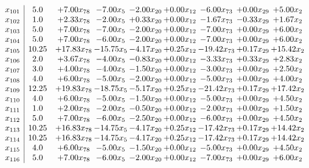 \documentclass[8pt]{article}
\begin{document}
\[\begin{array}{c| c c@{\hskip 2pt} c@{\hskip 2pt} c@{\hskip 2pt} c@{\hskip 2pt} c@{\hskip 2pt} c@{\hskip 2pt} c@{\hskip 2pt} }
 x_{101}   &  5.0 & +  7.00 x_{78} & -7.00 x_{5} & -2.00 x_{20} & +  0.00 x_{12} & -6.00 x_{73} & +  0.00 x_{29} & +  5.00 x_{2}\\
 x_{102}   &  1.0 & +  2.33 x_{78} & -2.00 x_{5} & +  0.33 x_{20} & +  0.00 x_{12} & -1.67 x_{73} & -0.33 x_{29} & +  1.67 x_{2}\\
 x_{103}   &  5.0 & +  7.00 x_{78} & -7.00 x_{5} & -2.00 x_{20} & +  0.00 x_{12} & -7.00 x_{73} & +  0.00 x_{29} & +  6.00 x_{2}\\
 x_{104}   &  5.0 & +  7.00 x_{78} & -6.00 x_{5} & -2.00 x_{20} & +  0.00 x_{12} & -7.00 x_{73} & +  0.00 x_{29} & +  6.00 x_{2}\\
 x_{105}   &  10.25 & + 17.83 x_{78} & -15.75 x_{5} & -4.17 x_{20} & +  0.25 x_{12} & -19.42 x_{73} & +  0.17 x_{29} & + 15.42 x_{2}\\
 x_{106}   &  2.0 & +  3.67 x_{78} & -4.00 x_{5} & -0.83 x_{20} & +  0.00 x_{12} & -3.33 x_{73} & +  0.33 x_{29} & +  2.83 x_{2}\\
 x_{107}   &  3.0 & +  4.00 x_{78} & -4.00 x_{5} & -1.50 x_{20} & +  0.00 x_{12} & -3.00 x_{73} & +  0.00 x_{29} & +  2.50 x_{2}\\
 x_{108}   &  4.0 & +  6.00 x_{78} & -5.00 x_{5} & -2.00 x_{20} & +  0.00 x_{12} & -5.00 x_{73} & +  0.00 x_{29} & +  4.00 x_{2}\\
 x_{109}   &  12.25 & + 19.83 x_{78} & -18.75 x_{5} & -5.17 x_{20} & +  0.25 x_{12} & -21.42 x_{73} & +  0.17 x_{29} & + 17.42 x_{2}\\
 x_{110}   &  4.0 & +  6.00 x_{78} & -5.00 x_{5} & -1.50 x_{20} & +  0.00 x_{12} & -5.00 x_{73} & +  0.00 x_{29} & +  4.50 x_{2}\\
 x_{111}   &  1.0 & +  2.00 x_{78} & -2.00 x_{5} & -0.50 x_{20} & +  0.00 x_{12} & -2.00 x_{73} & +  0.00 x_{29} & +  1.50 x_{2}\\
 x_{112}   &  5.0 & +  7.00 x_{78} & -6.00 x_{5} & -2.50 x_{20} & +  0.00 x_{12} & -6.00 x_{73} & +  0.00 x_{29} & +  4.50 x_{2}\\
 x_{113}   &  10.25 & + 16.83 x_{78} & -14.75 x_{5} & -4.17 x_{20} & +  0.25 x_{12} & -17.42 x_{73} & +  0.17 x_{29} & + 14.42 x_{2}\\
 x_{114}   &  10.25 & + 16.83 x_{78} & -14.75 x_{5} & -4.17 x_{20} & +  0.25 x_{12} & -17.42 x_{73} & +  0.17 x_{29} & + 14.42 x_{2}\\
 x_{115}   &  4.0 & +  6.00 x_{78} & -5.00 x_{5} & -1.50 x_{20} & +  0.00 x_{12} & -5.00 x_{73} & +  0.00 x_{29} & +  4.50 x_{2}\\
 x_{116}   &  5.0 & +  7.00 x_{78} & -6.00 x_{5} & -2.00 x_{20} & +  0.00 x_{12} & -7.00 x_{73} & +  0.00 x_{29} & +  6.00 x_{2}\\

\end{array}\]
\end{document}
